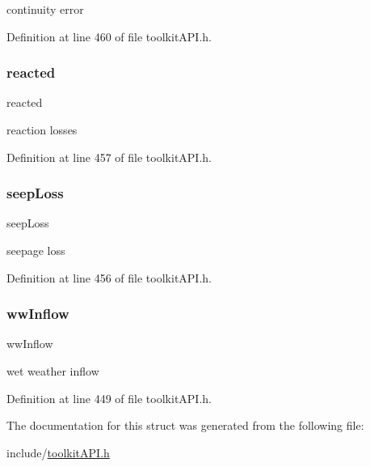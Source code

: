 continuity error 

Definition at line 460 of file toolkit\+A\+P\+I.\+h.

\mbox{\label{struct_s_m___routing_totals_a97407af14eadcba842d2dfc60c256612}} 
\subsubsection{\texorpdfstring{reacted}{reacted}}
{\footnotesize\ttfamily reacted}

reaction losses 

Definition at line 457 of file toolkit\+A\+P\+I.\+h.

\mbox{\label{struct_s_m___routing_totals_af23b8cac0bd9aa9dab61553ddc423443}} 
\subsubsection{\texorpdfstring{seep\+Loss}{seepLoss}}
{\footnotesize\ttfamily seep\+Loss}

seepage loss 

Definition at line 456 of file toolkit\+A\+P\+I.\+h.

\mbox{\label{struct_s_m___routing_totals_addf6c3df2db37a38a6f6d64a585f9b50}} 
\subsubsection{\texorpdfstring{ww\+Inflow}{wwInflow}}
{\footnotesize\ttfamily ww\+Inflow}

wet weather inflow 

Definition at line 449 of file toolkit\+A\+P\+I.\+h.



The documentation for this struct was generated from the following file\+:\begin{DoxyCompactItemize}
\item 
include/\hyperlink{toolkit_a_p_i_8h}{toolkit\+A\+P\+I.\+h}\end{DoxyCompactItemize}
